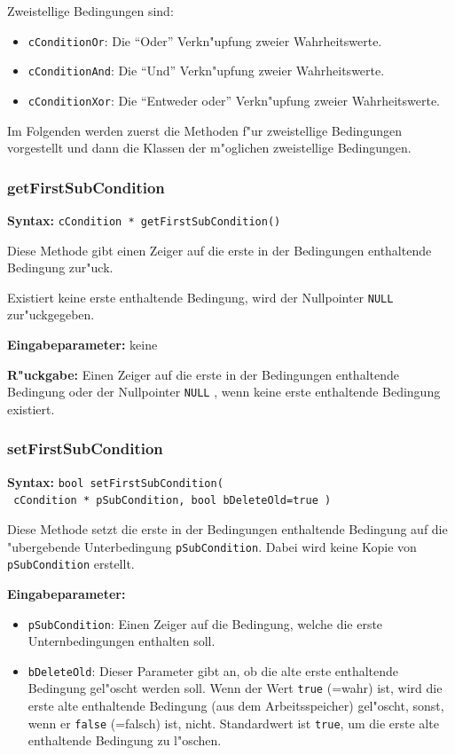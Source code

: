 \bigskip\noindent
Zweistellige Bedingungen sind:
\begin{itemize}
 \item \verb|cConditionOr|: Die ``Oder'' Verkn"upfung zweier Wahrheitswerte.
 \item \verb|cConditionAnd|: Die ``Und'' Verkn"upfung zweier Wahrheitswerte.
 \item \verb|cConditionXor|: Die ``Entweder oder'' Verkn"upfung zweier Wahrheitswerte.
\end{itemize}

Im Folgenden werden zuerst die Methoden f"ur zweistellige Bedingungen vorgestellt und dann die Klassen der m"oglichen zweistellige Bedingungen.


\subsubsection{getFirstSubCondition}

\textbf{Syntax:} \verb|cCondition * getFirstSubCondition()|

\bigskip\noindent
Diese Methode gibt einen Zeiger auf die erste in der Bedingungen enthaltende Bedingung zur"uck.

Existiert keine erste enthaltende Bedingung, wird der Nullpointer \verb|NULL| zur"uckgegeben.

\bigskip\noindent
\textbf{Eingabeparameter:} keine

\bigskip\noindent
\textbf{R"uckgabe:} Einen Zeiger auf die erste in der Bedingungen enthaltende Bedingung oder der Nullpointer \verb|NULL| , wenn keine erste enthaltende Bedingung existiert.


\subsubsection{setFirstSubCondition}

\textbf{Syntax:} \verb|bool setFirstSubCondition(| \\\verb| cCondition * pSubCondition, bool bDeleteOld=true )|

\bigskip\noindent
Diese Methode setzt die erste in der Bedingungen enthaltende Bedingung auf die "ubergebende Unterbedingung \verb|pSubCondition|. Dabei wird keine Kopie von \verb|pSubCondition| erstellt.

\bigskip\noindent
\textbf{Eingabeparameter:}
\begin{itemize}
 \item \verb|pSubCondition|: Einen Zeiger auf die Bedingung, welche die erste Unternbedingungen enthalten soll.
 \item \verb|bDeleteOld|: Dieser Parameter gibt an, ob die alte erste enthaltende Bedingung gel"oscht werden soll. Wenn der Wert \verb|true| (=wahr) ist, wird die erste alte enthaltende Bedingung (aus dem Arbeitsspeicher) gel"oscht, sonst, wenn er \verb|false| (=falsch) ist, nicht. Standardwert ist \verb|true|, um die erste alte enthaltende Bedingung zu l"oschen.
\end{itemize}

